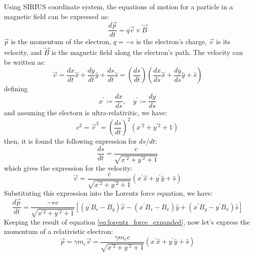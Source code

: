 \documentclass[a4paper,12pt]{article}
\begin{document}
Using SIRIUS coordinate system, the equations of motion for a particle in a magnetic field can be expressed as:
\begin{equation}
    \frac{d\vec{p}}{dt} = q\vec{v} \times \vec{B}
    \label{eq:lorentz_force}
\end{equation}
$\vec{p}$ is the momentum of the electron, $q= -e$ is the electron's charge, $\vec{v}$ is its velocity, and $\vec{B}$ is
the magnetic field along the electron's path.
The velocity can be written as:
\begin{equation}
    \vec{v} = \frac{dx}{dt}\hat{x} + \frac{dy}{dt}\hat{y} + \frac{ds}{dt}\hat{s} = 
    \left(\frac{ds}{dt}\right)\left(\frac{dx}{ds}\hat{x} + \frac{dy}{ds}\hat{y} + \hat{s}\right)
    \label{eq:velocity}
\end{equation}
defining
\begin{equation}
    x^{\prime} \coloneqq \frac{dx}{ds}, \quad y^{\prime} \coloneqq \frac{dy}{ds}
    \label{eq:prime}
\end{equation}
and assuming the electorn is ultra-relativitic, we have:
\begin{equation}
    c^2 = \vec{v}^2 = \left(\frac{ds}{dt}\right)^2(x^{\prime 2} + y^{\prime 2} + 1)
\end{equation}
then, it is found the following expression for $ds/dt$:
\begin{equation}
    \frac{ds}{dt} = \frac{c}{\sqrt{x^{\prime 2} + y^{\prime 2} + 1}}
\end{equation}
which gives the expression for the velocity:
\begin{equation}
    \vec{v} = \frac{c}{\sqrt{x^{\prime 2} + y^{\prime 2} + 1}}\left(x^{\prime}\hat{x} + y^{\prime}\hat{y} + \hat{s}\right)
\end{equation}
Substituting this expression into the Lorentz force equation, we have:
\begin{equation}
    \frac{d\vec{p}}{dt} = \frac{-ec}{\sqrt{x^{\prime 2} + y^{\prime 2} + 1}}\left[(y^{\prime} B_s-B_y)\hat{x} -(x^{\prime} B_s-B_x)\hat{y} + (x^{\prime} B_y-y^{\prime} B_x)\hat{s}\right]
    \label{eq:lorentz_force_expanded}
\end{equation}
Keeping the result of equation \eqref{eq:lorentz_force_expanded}, now let's express the momentum of a relativistic electron:
\begin{equation}
    \vec{p} = \gamma m_e \vec{v} = \frac{\gamma m_e c}{\sqrt{x^{\prime 2} + y^{\prime 2} + 1}}\left(x^{\prime}\hat{x} + y^{\prime}\hat{y} + \hat{s}\right)
\end{equation}
\end{document}
